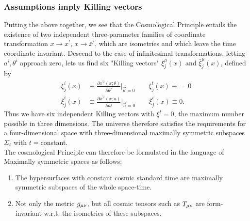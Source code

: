 \subsubsection{Assumptions imply Killing vectors}
Putting the above together, we see that the Cosmological Principle entails the existence of two independent three-parameter families of coordinate transformation $x\rightarrow x^\prime$, $x\rightarrow\bar{x}^\prime$, which are isometries and which leave the time coordinate invariant. Descend to the case of infinitesimal transformations, letting $a^i, \theta^i$ approach zero, lets us find six "Killing vectors" $\xi^\mu_j(x)$ and $\bar{\xi}^\mu_j(x)$, defined by
\begin{align}
	\label{eq:cosmologicalKillingVectors}
	\xi^i_j(x) & \equiv \frac{\partial x^{\prime i}(x;\theta)}{\partial \theta^j} |_{\vec{\theta}=0} \qquad  \xi^t_j(x)\equiv=0\\
	\bar{\xi}^i_j(x) &\equiv \frac{\partial \bar{x}^{\prime i} (x;a)}{\partial a^j} |_{\vec{a}=0} \qquad \bar{\xi}^i_j(x)\equiv 0.
\end{align}
Thus we have six independent Killing vectors with $\xi^t=0$, the maximum number possible in three dimensions. The universe therefore satisfies the requirements for a four-dimensional space with three-dimensional maximally symmetric subspaces $\Sigma_t$ with $t=$constant.\\
The cosmological Principle can therefore be formulated in the language of Maximally symmetric spaces as follows:
\begin{enumerate}
	\item The hypersurfaces with constant cosmic standard time are maximally symmetric subspaces of the whole space-time.
	\item Not only the metric $g_{\mu \nu}$, but all cosmic tensors such as $T_{\mu \nu}$ are form-invariant w.r.t. the isometries of these subspaces.
\end{enumerate}






